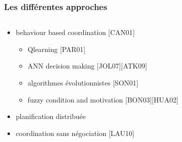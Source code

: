\documentclass{beamer}
\begin{document}
\begin{frame}
\frametitle{Les différentes approches}
\begin{columns}
    \begin{column}{0.75\textwidth}
        \begin{itemize}
            \item behaviour based coordination $[$CAN01$]$
            \begin{itemize}
                \item Qlearning $[$PAR01$]$
                \item ANN decision making $[$JOL07$][$ATK09$]$
                \item algorithmes évolutionnistes $[$SON01$]$
                \item fuzzy condition and motivation $[$BON03$][$HUA02$]$
            \end{itemize}
            \item planification distribuée
            \item coordination sans négociation $[$LAU10$]$
        \end{itemize}
    \end{column}
    \begin{column}{0.25\textwidth}
        \begin{center}

\end{center}
\end{column}
\end{columns}
\end{frame}
\end{document}
